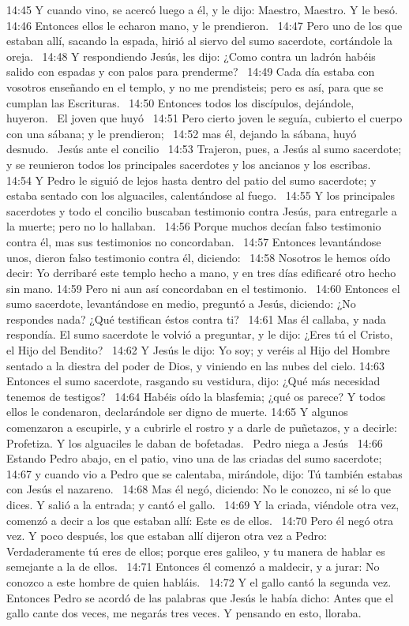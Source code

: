 14:45 Y cuando vino, se acercó luego a él, y le dijo: Maestro, Maestro. Y le besó.  
14:46 Entonces ellos le echaron mano, y le prendieron.  
14:47 Pero uno de los que estaban allí, sacando la espada, hirió al siervo del sumo sacerdote, cortándole la oreja.  
14:48 Y respondiendo Jesús, les dijo: ¿Como contra un ladrón habéis salido con espadas y con palos para prenderme?  
14:49 Cada día estaba con vosotros enseñando en el templo, y no me prendisteis; pero es así, para que se cumplan las Escrituras.  
14:50 Entonces todos los discípulos, dejándole, huyeron.  
El joven que huyó  
14:51 Pero cierto joven le seguía, cubierto el cuerpo con una sábana; y le prendieron;  
14:52 mas él, dejando la sábana, huyó desnudo.  
Jesús ante el concilio   
14:53 Trajeron, pues, a Jesús al sumo sacerdote; y se reunieron todos los principales sacerdotes y los ancianos y los escribas.  
14:54 Y Pedro le siguió de lejos hasta dentro del patio del sumo sacerdote; y estaba sentado con los alguaciles, calentándose al fuego.  
14:55 Y los principales sacerdotes y todo el concilio buscaban testimonio contra Jesús, para entregarle a la muerte; pero no lo hallaban.  
14:56 Porque muchos decían falso testimonio contra él, mas sus testimonios no concordaban.  
14:57 Entonces levantándose unos, dieron falso testimonio contra él, diciendo:  
14:58 Nosotros le hemos oído decir: Yo derribaré este templo hecho a mano, y en tres días edificaré otro hecho sin mano. 
14:59 Pero ni aun así concordaban en el testimonio.  
14:60 Entonces el sumo sacerdote, levantándose en medio, preguntó a Jesús, diciendo: ¿No respondes nada? ¿Qué testifican éstos contra ti?  
14:61 Mas él callaba, y nada respondía. El sumo sacerdote le volvió a preguntar, y le dijo: ¿Eres tú el Cristo, el Hijo del Bendito?  
14:62 Y Jesús le dijo: Yo soy; y veréis al Hijo del Hombre sentado a la diestra del poder de Dios, y viniendo en las nubes del cielo. 
14:63 Entonces el sumo sacerdote, rasgando su vestidura, dijo: ¿Qué más necesidad tenemos de testigos?  
14:64 Habéis oído la blasfemia; ¿qué os parece? Y todos ellos le condenaron, declarándole ser digno de muerte. 
14:65 Y algunos comenzaron a escupirle, y a cubrirle el rostro y a darle de puñetazos, y a decirle: Profetiza. Y los alguaciles le daban de bofetadas.  
Pedro niega a Jesús   
14:66 Estando Pedro abajo, en el patio, vino una de las criadas del sumo sacerdote;  
14:67 y cuando vio a Pedro que se calentaba, mirándole, dijo: Tú también estabas con Jesús el nazareno.  
14:68 Mas él negó, diciendo: No le conozco, ni sé lo que dices. Y salió a la entrada; y cantó el gallo.  
14:69 Y la criada, viéndole otra vez, comenzó a decir a los que estaban allí: Este es de ellos.  
14:70 Pero él negó otra vez. Y poco después, los que estaban allí dijeron otra vez a Pedro: Verdaderamente tú eres de ellos; porque eres galileo, y tu manera de hablar es semejante a la de ellos.  
14:71 Entonces él comenzó a maldecir, y a jurar: No conozco a este hombre de quien habláis.  
14:72 Y el gallo cantó la segunda vez. Entonces Pedro se acordó de las palabras que Jesús le había dicho: Antes que el gallo cante dos veces, me negarás tres veces. Y pensando en esto, lloraba.  
